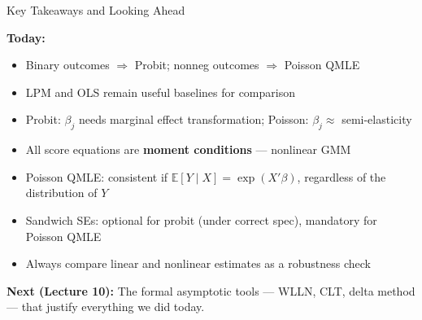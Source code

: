\documentclass[aspectratio=169, handout, t]{beamer}
\numberwithin{equation}{section}
\begin{document}
\begin{frame}{Key Takeaways and Looking Ahead}

\textbf{Today:}
\begin{itemize}
    \item Binary outcomes $\Rightarrow$ Probit; nonneg outcomes $\Rightarrow$ Poisson QMLE
    \item LPM and OLS remain useful baselines for comparison
    \item Probit: $\beta_j$ needs marginal effect transformation; Poisson: $\beta_j \approx$ semi-elasticity
    \item All score equations are \textbf{moment conditions} --- nonlinear GMM
    \item Poisson QMLE: consistent if $\mathbb{E}[Y \mid X] = \exp(X'\beta)$, regardless of the distribution of $Y$
    \item Sandwich SEs: optional for probit (under correct spec), \alert{mandatory} for Poisson QMLE
    \item Always compare linear and nonlinear estimates as a robustness check
\end{itemize}

\pause

\bigskip

\textbf{Next (Lecture 10):} The formal asymptotic tools --- WLLN, CLT, delta method --- that justify everything we did today.

\end{frame}
\end{document}
